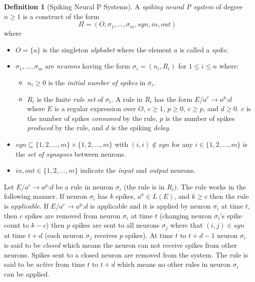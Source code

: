 \documentclass[]{elsarticle}
\theoremstyle{definition}
\newtheorem{definition2}{Definition}
\theoremstyle{definition}
\newcommand{\ra}{\rightarrow}
\newcommand{\sm}{\text{:}}
\begin{document}
\begin{definition2}[Spiking Neural P Systems]
A \emph{spiking neural P system}  of degree $n\geq1$ is a construct of the form $$\Pi = (O,\sigma_1,
...,\sigma_m, syn, in,out)$$ where
\begin{itemize}
   \item $O=\{a\}$ is the singleton \emph{alphabet} where the element $a$ is called a \emph{spike}.
   \item $\sigma_1,...,\sigma_m$ are \emph{neurons} having the form $\sigma_i=(n_i,R_i)$ for 
         $1 \leq i \leq n$ where:
         \begin{itemize}
            \item $n_i \geq 0$ is the \emph{initial number of spikes} in $\sigma_i$.
            \item $R_i$ is the finite \emph{rule set} of $\sigma_i$. A rule in $R_i$ has the form
                  $E/a^c \ra a^p\sm d$ where $E$ is a regular expression over $O$, $c\geq 1$, $p\geq0$,
                  $c\geq p$, and $d\geq 0$. $c$ is the number of spikes \emph{consumed} by the rule, 
                  $p$ is the number of spikes \emph{produced} by the rule, and $d$ is the spiking 
                  \emph{delay}.
         \end{itemize}
   \item $syn \subseteq \{1,2,...,m\} \times \{1,2,...,m\}$ with $(i,i) \notin syn$ for any
         $i \in \{1,2,...,m\}$ is the \emph{set of synapses} between neurons.
   \item $in,out \in \{1,2,...,m\}$ indicate the \emph{input} and \emph{output} neurons. 
\end{itemize} 
\end{definition2}

Let $E/a^c \ra a^p\sm d$ be a rule in neuron $\sigma_i$ (the rule is in $R_i)$. The rule works in the 
following manner. If neuron $\sigma_i$ has $k$ spikes, $a^k \in L(E)$, and $k \geq c$ then the rule
is \emph{applicable}. If $E/a^c \ra a^p\sm d$ is applicable and it is applied by neuron $\sigma_i$ at 
time $t$, then $c$ spikes are removed from neuron $\sigma_i$ at time $t$ (changing neuron
$\sigma_i$'s spike count to $k-c$) then $p$ spikes are sent to all neurons $\sigma_j$ where that 
$(i,j)\in syn$ at time $t+d$ (each neuron $\sigma_j$ receives $p$ spikes). At time $t$ to $t+d-1$ 
neuron $\sigma_i$ is said to be \emph{closed} which means the neuron can not receive spikes from 
other neurons. Spikes sent to a closed neuron are removed from the system. The rule is said to be
\emph{active} from time $t$ to $t+d$ which means no other rules in neuron $\sigma_i$ can be applied.
\end{document}
